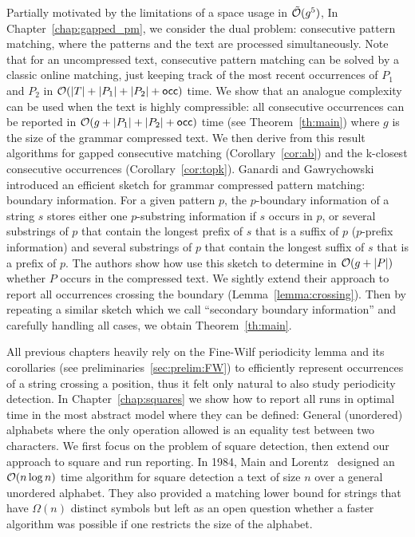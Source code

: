 Partially motivated by the limitations of a space usage in $\tilde {\mathcal{O}}(g^5)$, In Chapter~\ref{chap:gapped_pm}, we consider the dual problem: consecutive pattern matching, where the patterns and the text are processed simultaneously. Note that for an uncompressed text, consecutive pattern matching can be solved by a classic online matching, just keeping track of the most recent occurrences of $P_1$ and $P_2$ in $\mathcal{O}(|T|+|P_1|+|P_2|+\mathsf{occ})$ time.
We show that an analogue complexity can be used when the text is highly compressible: all consecutive occurrences can be reported in $\mathcal{O}(g+|P_1|+|P_2|+\mathsf{occ})$ time (see Theorem~\ref{th:main}) where $g$ is the size of the grammar compressed text. We then derive from this result algorithms for gapped consecutive matching (Corollary~\ref{cor:ab}) and the k-closest consecutive occurrences (Corollary~\ref{cor:topk}).
Ganardi and Gawrychowski~\cite{DBLP:conf/soda/GanardiG22} introduced an efficient sketch for grammar compressed pattern matching: boundary information. For a given pattern $p$, the $p$-boundary information of a string $s$ stores either one $p$-substring information if $s$ occurs in $p$, or several substrings of $p$ that contain the longest prefix of $s$ that is a suffix of $p$ ($p$-prefix information) and several substrings of $p$ that contain the longest suffix of $s$ that is a prefix of $p$. The authors show how use this sketch to determine in $\mathcal{O}(g+|P|)$ whether $P$ occurs in the compressed text. We sightly extend their approach to report all occurrences crossing the boundary (Lemma~\ref{lemma:crossing}). Then by repeating a similar sketch which we call ``secondary boundary information'' and  carefully handling all cases, we obtain Theorem~\ref{th:main}.

All previous chapters heavily rely on the Fine-Wilf periodicity lemma and its corollaries (see preliminaries~\ref{sec:prelim:FW}) to efficiently represent occurrences of a string crossing a position, thus it felt only natural to also study periodicity detection. In Chapter~\ref{chap:squares} we show how to report all runs  in optimal time in the most abstract model where they can be defined: General (unordered) alphabets where the only operation allowed is an equality test between two characters. 
We first focus on the problem of square detection, then extend our approach to square and run reporting.
In 1984, Main and Lorentz~\cite{Main1984} designed an $\mathcal{O}(n\log n)$ time algorithm for square detection a text of size $n$ over a general unordered alphabet. They also provided a matching lower bound for strings that have $\Omega(n)$ distinct symbols but left as an open question whether a faster algorithm was possible if one restricts the size of the alphabet.




